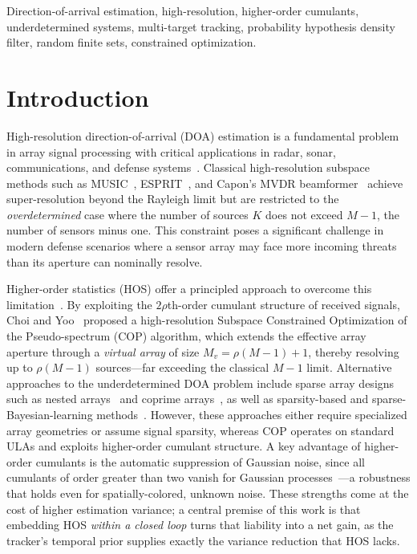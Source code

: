 \documentclass[journal]{IEEEtran}
\begin{document}
\begin{IEEEkeywords}
Direction-of-arrival estimation, high-resolution, higher-order cumulants, underdetermined systems, multi-target tracking, probability hypothesis density filter, random finite sets, constrained optimization.
\end{IEEEkeywords}

\section{Introduction}
\label{sec:intro}

High-resolution direction-of-arrival (DOA) estimation is a fundamental problem in array signal processing with critical applications in radar, sonar, communications, and defense systems~\cite{barshalom2011tracking,neri2018defense}. Classical high-resolution subspace methods such as MUSIC~\cite{schmidt1986music}, ESPRIT~\cite{roy1989esprit}, and Capon's MVDR beamformer~\cite{capon1969mvdr} achieve super-resolution beyond the Rayleigh limit but are restricted to the \emph{overdetermined} case where the number of sources $K$ does not exceed $M-1$, the number of sensors minus one. This constraint poses a significant challenge in modern defense scenarios where a sensor array may face more incoming threats than its aperture can nominally resolve.

Higher-order statistics (HOS) offer a principled approach to overcome this limitation~\cite{porat1991doa,chevalier2006hos}. By exploiting the $2\rho$th-order cumulant structure of received signals, Choi and Yoo~\cite{choi2015underdetermined} proposed a high-resolution Subspace Constrained Optimization of the Pseudo-spectrum (COP) algorithm, which extends the effective array aperture through a \emph{virtual array} of size $M_v = \rho(M-1)+1$, thereby resolving up to $\rho(M-1)$ sources---far exceeding the classical $M-1$ limit. Alternative approaches to the underdetermined DOA problem include sparse array designs such as nested arrays~\cite{pal2010nested} and coprime arrays~\cite{vaidyanathan2011coprime,liu2018superresolution,zhou2018deformed}, as well as sparsity-based and sparse-Bayesian-learning methods~\cite{malioutov2005l1svd,wipf2004sbl,gerstoft2016sbl}. However, these approaches either require specialized array geometries or assume signal sparsity, whereas COP operates on standard ULAs and exploits higher-order cumulant structure. A key advantage of higher-order cumulants is the automatic suppression of Gaussian noise, since all cumulants of order greater than two vanish for Gaussian processes~\cite{mendel1991tutorial}---a robustness that holds even for spatially-colored, unknown noise. These strengths come at the cost of higher estimation variance; a central premise of this work is that embedding HOS \emph{within a closed loop} turns that liability into a net gain, as the tracker's temporal prior supplies exactly the variance reduction that HOS lacks.
\end{document}
